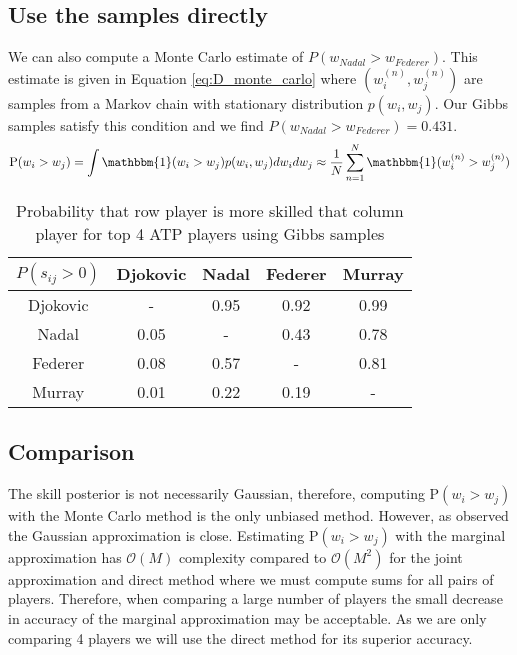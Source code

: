 \documentclass[11pt]{article}
\begin{document}
\subsection{Use the samples directly}
We can also compute a Monte Carlo estimate of $P(w_{Nadal} > w_{Federer})$. This estimate is given in Equation \ref{eq:D_monte_carlo} where $(w_{i}^{(n)}, w_{j}^{(n)})$ are samples from a Markov chain with stationary distribution $p(w_{i}, w_{j})$. Our Gibbs samples satisfy this condition and we find $P(w_{Nadal} > w_{Federer}) = 0.431$.
\begin{equation}
    \text{P}(w_{i} > w_{j}) = \int \mathbbm{1}(w_{i} > w_{j}) p(w_{i}, w_{j}) dw_{i} dw_{j} \approx \frac{1}{N} \sum_{n=1}^{N} \mathbbm{1}(w_{i}^{(n)} > w_{j}^{(n)})
    \label{eq:D_monte_carlo}
\end{equation}

\begin{table}
    \centering
    \small
    \setlength{\tabcolsep}{2pt}
    \begin{tabular}{|c|c c c c|}
        \hline
        $P(s_{ij}>0)$ & Djokovic & Nadal & Federer & Murray \\
        \hline
        Djokovic & -    & 0.95 & 0.92 & 0.99 \\
        Nadal    & 0.05 & -    & 0.43 & 0.78 \\
        Federer  & 0.08 & 0.57 & -    & 0.81 \\
        Murray   & 0.01 & 0.22 & 0.19 & -    \\
        \hline
    \end{tabular}
    \caption{Probability that row player is more skilled that column player for top 4 ATP players using Gibbs samples}
    \label{tbl:D_skill_difference}
\end{table}

\subsection{Comparison}
The skill posterior is not necessarily Gaussian, therefore, computing $\text{P}(w_{i} > w_{j})$ with the Monte Carlo method is the only unbiased method. However, as observed the Gaussian approximation is close. Estimating $\text{P}(w_{i} > w_{j})$ with the marginal approximation has $\mathcal{O}(M)$ complexity compared to $\mathcal{O}(M^2)$ for the joint approximation and direct method where we must compute sums for all pairs of players. Therefore, when comparing a large number of players the small decrease in accuracy of the marginal approximation may be acceptable. As we are only comparing 4 players we will use the direct method for its superior accuracy.
\end{document}
